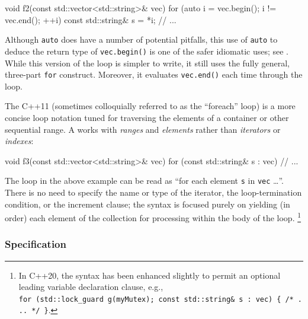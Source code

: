 \begin{emcppslisting}[emcppsbatch=e1]
void f2(const std::vector<std::string>& vec)
{
    for (auto i = vec.begin(); i != vec.end(); ++i)
    {
        const std::string& s = *i;
        // ...
    }
}
\end{emcppslisting}


\noindent Although \lstinline!auto! does have a number of potential pitfalls, this
use of \lstinline!auto! to deduce the return type of \lstinline!vec.begin()!
is one of the safer idiomatic uses; see . While this
version of the loop is simpler to write, it still uses the fully
general, three-part \lstinline!for! construct. Moreover, it evaluates
\lstinline!vec.end()! each time through the loop.

The C++11  (sometimes colloquially
referred to as the ``foreach'' loop) is a more concise loop notation
tuned for traversing the elements of a container or other sequential
range. A  works with \emph{ranges}
and \emph{elements} rather than \emph{iterators} or \emph{indexes}:

\begin{emcppslisting}[emcppsbatch=e1,label={iterating-over-std::vector-with-a-range-based-for-loop}]
void f3(const std::vector<std::string>& vec)
{
    for (const std::string& s : vec)
    {
        // ...
    }
}
\end{emcppslisting}


\noindent The loop in the above example can be read as ``for each element
\lstinline!s! in \lstinline!vec! \ldots''. There is no need to specify the
name or type of the iterator, the loop-termination condition, or the
increment clause; the syntax is focused purely on yielding (in order)
each element of the collection for processing within the body of the
loop. {\cprotect\footnote{In C++20, the syntax has been enhanced
slightly to permit an optional leading variable declaration clause,
e.g.,
  \lstinline!for!~\lstinline!(std::lock_guard!~\lstinline!g(myMutex);!~\lstinline!const!~\lstinline!std::string&!~\lstinline!s!~\lstinline!:!~\lstinline!vec)!~\lstinline!{!~\lstinline!/*!~\lstinline!...!~\lstinline!*/!~\lstinline!}!.}}

\subsubsection[Specification]{Specification}\label{specification}

